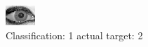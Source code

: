 \begin{figure}[h!]
\begin{center}
\includegraphics[width=0.60\columnwidth]{figures/ID2046_class_1_target_2.png}
\end{center}
\caption{ Classification: 1 actual target: 2}
\label{fig:ID2046_class_1_target_2}
\end{figure}
